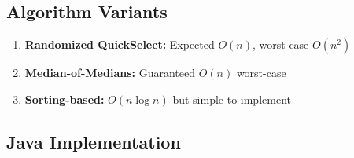 \documentclass[12pt,a4paper]{article}
\begin{document}
\subsection{Algorithm Variants}

\begin{enumerate}
    \item \textbf{Randomized QuickSelect:} Expected $O(n)$, worst-case $O(n^2)$
    \item \textbf{Median-of-Medians:} Guaranteed $O(n)$ worst-case
    \item \textbf{Sorting-based:} $O(n \log n)$ but simple to implement
\end{enumerate}

\subsection{Java Implementation}
\end{document}
